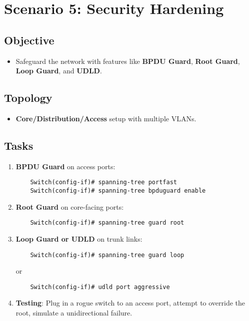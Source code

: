 \documentclass[a4paper]{report}
\begin{document}
\section{Scenario 5: Security Hardening}
\subsection{Objective}
\begin{itemize}
    \item Safeguard the network with features like \textbf{BPDU Guard}, \textbf{Root Guard}, \textbf{Loop Guard}, and \textbf{UDLD}.
\end{itemize}

\subsection{Topology}
\begin{itemize}
    \item \textbf{Core/Distribution/Access} setup with multiple VLANs.
\end{itemize}

\subsection{Tasks}
\begin{enumerate}
    \item \textbf{BPDU Guard} on access ports:
    \begin{lstlisting}
    Switch(config-if)# spanning-tree portfast
    Switch(config-if)# spanning-tree bpduguard enable
    \end{lstlisting}
    \item \textbf{Root Guard} on core-facing ports:
    \begin{lstlisting}
    Switch(config-if)# spanning-tree guard root
    \end{lstlisting}
    \item \textbf{Loop Guard or UDLD} on trunk links:
    \begin{lstlisting}
    Switch(config-if)# spanning-tree guard loop
    \end{lstlisting}
    or
    \begin{lstlisting}
    Switch(config-if)# udld port aggressive
    \end{lstlisting}
    \item \textbf{Testing}: Plug in a rogue switch to an access port, attempt to override the root, simulate a unidirectional failure.
\end{enumerate}
\end{document}
